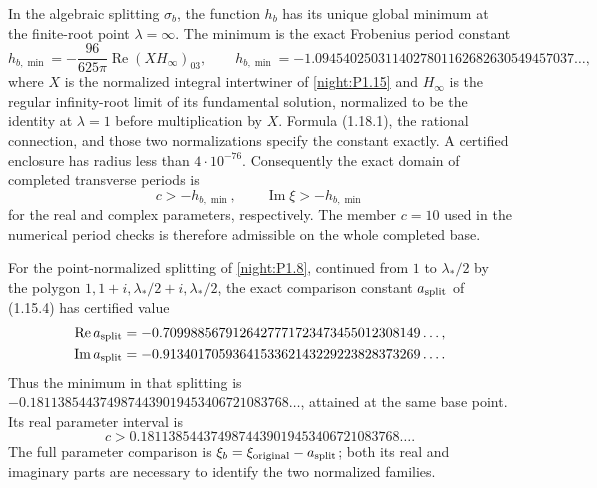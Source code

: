 \begin{theorem}\hypertarget{tag-02QR}{}\label{night:P1.18}
In the algebraic splitting $\sigma_b$, the function $h_b$ has its
unique global minimum at the finite-root point $\lambda=\infty$.
The minimum is the exact Frobenius period constant
\[
 h_{b,\min}=-\frac{96}{625\pi}\operatorname{Re}(XH_\infty)_{03},
 \qquad
 h_{b,\min}=-1.0945402503114027801162682630549457037\ldots,
\tag{1.18.1}
\]
where $X$ is the normalized integral intertwiner of \cref{night:P1.15} and
$H_\infty$ is the regular infinity-root limit of its fundamental
solution, normalized to be the identity at $\lambda=1$ before
multiplication by $X$.  Formula (1.18.1), the rational connection,
and those two normalizations specify the constant exactly.
A certified enclosure has radius less than $4\cdot10^{-76}$.
Consequently the exact domain of completed transverse periods is
\[
 c>-h_{b,\min},\qquad
 \operatorname{Im}\xi>-h_{b,\min}
\]
for the real and complex parameters, respectively.
The member $c=10$ used in the numerical period checks is therefore
admissible on the whole completed base.

For the point-normalized splitting of \cref{night:P1.8}, continued from
$1$ to $\lambda_*/2$ by the polygon
$1,1+i,\lambda_*/2+i,\lambda_*/2$, the exact comparison constant
$a_{\rm split}$ of (1.15.4) has certified value
\[
\begin{split}
 \operatorname{Re}a_{\rm split}
   &=-0.7099885679126427771723473455012308149\ldots,\\
 \operatorname{Im}a_{\rm split}
   &=-0.9134017059364153362143229223828373269\ldots.
\end{split}
\]
Thus the minimum in that splitting is
$-0.1811385443749874439019453406721083768\ldots$,
attained at the same base point.  Its real parameter interval is
\[
 c>0.1811385443749874439019453406721083768\ldots.
\]
The full parameter comparison is
$\xi_b=\xi_{\rm original}-a_{\rm split}$; both its real and imaginary
parts are necessary to identify the two normalized families.
\end{theorem}
